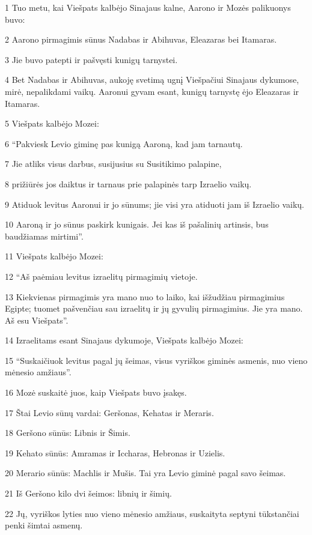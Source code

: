 \par 1 Tuo metu, kai Viešpats kalbėjo Sinajaus kalne, Aarono ir Mozės palikuonys buvo: 
\par 2 Aarono pirmagimis sūnus Nadabas ir Abihuvas, Eleazaras bei Itamaras. 
\par 3 Jie buvo patepti ir pašvęsti kunigų tarnystei. 
\par 4 Bet Nadabas ir Abihuvas, aukoję svetimą ugnį Viešpačiui Sinajaus dykumose, mirė, nepalikdami vaikų. Aaronui gyvam esant, kunigų tarnystę ėjo Eleazaras ir Itamaras. 
\par 5 Viešpats kalbėjo Mozei: 
\par 6 “Pakviesk Levio giminę pas kunigą Aaroną, kad jam tarnautų. 
\par 7 Jie atliks visus darbus, susijusius su Susitikimo palapine, 
\par 8 prižiūrės jos daiktus ir tarnaus prie palapinės tarp Izraelio vaikų. 
\par 9 Atiduok levitus Aaronui ir jo sūnums; jie visi yra atiduoti jam iš Izraelio vaikų. 
\par 10 Aaroną ir jo sūnus paskirk kunigais. Jei kas iš pašalinių artinsis, bus baudžiamas mirtimi”. 
\par 11 Viešpats kalbėjo Mozei: 
\par 12 “Aš paėmiau levitus izraelitų pirmagimių vietoje. 
\par 13 Kiekvienas pirmagimis yra mano nuo to laiko, kai išžudžiau pirmagimius Egipte; tuomet pašvenčiau sau izraelitų ir jų gyvulių pirmagimius. Jie yra mano. Aš esu Viešpats”. 
\par 14 Izraelitams esant Sinajaus dykumoje, Viešpats kalbėjo Mozei: 
\par 15 “Suskaičiuok levitus pagal jų šeimas, visus vyriškos giminės asmenis, nuo vieno mėnesio amžiaus”. 
\par 16 Mozė suskaitė juos, kaip Viešpats buvo įsakęs. 
\par 17 Štai Levio sūnų vardai: Geršonas, Kehatas ir Meraris. 
\par 18 Geršono sūnūs: Libnis ir Šimis. 
\par 19 Kehato sūnūs: Amramas ir Iccharas, Hebronas ir Uzielis. 
\par 20 Merario sūnūs: Machlis ir Mušis. Tai yra Levio giminė pagal savo šeimas. 
\par 21 Iš Geršono kilo dvi šeimos: libnių ir šimių. 
\par 22 Jų, vyriškos lyties nuo vieno mėnesio amžiaus, suskaityta septyni tūkstančiai penki šimtai asmenų. 
